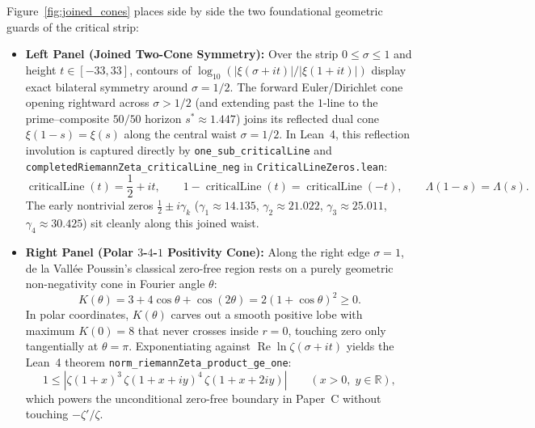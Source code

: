 \documentclass[11pt,a4paper]{article}
\newcommand{\Rset}{\mathbb{R}}
\begin{document}
Figure~\ref{fig:joined_cones} places side by side the two foundational geometric guards of the critical strip:
\begin{itemize}[noitemsep]
    \item \textbf{Left Panel (Joined Two-Cone Symmetry):} Over the strip $0 \le \sigma \le 1$ and height $t \in [-33, 33]$, contours of $\log_{10}(|\xi(\sigma+it)| / |\xi(1+it)|)$ display exact bilateral symmetry around $\sigma = 1/2$. The forward Euler/Dirichlet cone opening rightward across $\sigma > 1/2$ (and extending past the $1$-line to the prime--composite $50/50$ horizon $s^* \approx 1.447$) joins its reflected dual cone $\xi(1-s) = \xi(s)$ along the central waist $\sigma = 1/2$. In Lean~4, this reflection involution is captured directly by \texttt{one\_sub\_criticalLine} and \texttt{completedRiemannZeta\_\allowbreak criticalLine\_neg} in \texttt{CriticalLineZeros.lean}:
    \begin{equation}
        \operatorname{criticalLine}(t) = \frac{1}{2} + it, \qquad 1 - \operatorname{criticalLine}(t) = \operatorname{criticalLine}(-t), \qquad \Lambda(1 - s) = \Lambda(s).
    \end{equation}
    The early nontrivial zeros $\frac{1}{2} \pm i\gamma_k$ ($\gamma_1 \approx 14.135$, $\gamma_2 \approx 21.022$, $\gamma_3 \approx 25.011$, $\gamma_4 \approx 30.425$) sit cleanly along this joined waist.
    \item \textbf{Right Panel (Polar $3$-$4$-$1$ Positivity Cone):} Along the right edge $\sigma = 1$, de la Vall{\'e}e Poussin's classical zero-free region rests on a purely geometric non-negativity cone in Fourier angle $\theta$:
    \begin{equation}
        K(\theta) = 3 + 4\cos\theta + \cos(2\theta) = 2(1 + \cos\theta)^2 \ge 0.
    \end{equation}
    In polar coordinates, $K(\theta)$ carves out a smooth positive lobe with maximum $K(0) = 8$ that never crosses inside $r = 0$, touching zero only tangentially at $\theta = \pi$. Exponentiating against $\operatorname{Re}\ln\zeta(\sigma + it)$ yields the Lean~4 theorem \texttt{norm\_riemannZeta\_\allowbreak product\_ge\_one}:
    \begin{equation}
        1 \le \left|\zeta(1+x)^3 \, \zeta(1+x+iy)^4 \, \zeta(1+x+2iy)\right| \qquad (x > 0,\; y \in \Rset),
    \end{equation}
    which powers the unconditional zero-free boundary in Paper~C without touching $-\zeta'/\zeta$.
\end{itemize}
\end{document}
